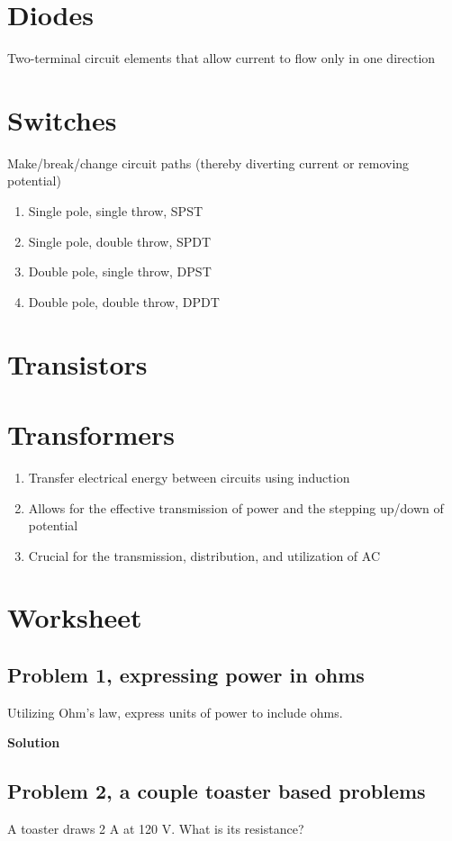 \documentclass[11pt]{book}
\begin{document}
\section{Diodes}
Two-terminal circuit elements that allow current to flow only in one direction

\section{Switches}
Make/break/change circuit paths (thereby diverting current or removing potential)

\begin{enumerate}
	\item Single pole, single throw, SPST
	\item Single pole, double throw, SPDT
	\item Double pole, single throw, DPST
	\item Double pole, double throw, DPDT
\end{enumerate}


\section{Transistors}


\section{Transformers}
\begin{enumerate}
	\item Transfer electrical energy between circuits using induction
	\item Allows for the effective transmission of power and the stepping up/down of potential
	\item Crucial for the transmission, distribution, and utilization of AC
\end{enumerate}

\newpage
\section{Worksheet}
\subsection{Problem 1, expressing power in ohms}
Utilizing Ohm's law, express units of power to include ohms.

\textbf{Solution}


\subsection{Problem 2, a couple toaster based problems}
A toaster draws 2 A at 120 V. What is its resistance?
\end{document}
